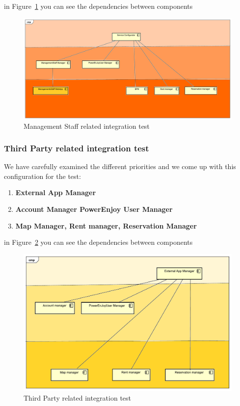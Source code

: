 \documentclass[english]{article}
\begin{document}
			in Figure~\ref{fig:managementstaff} you can see the dependencies between components  
			\begin{figure}[H]
				\centering
				\includegraphics[scale=0.3]{./testingOrganization/managementstaff.pdf}%
				\caption{Management Staff related integration test}
				\label{fig:managementstaff}
			\end{figure}
		
		\subsubsection{Third Party related integration test}
		       We have carefully examined the different priorities and we come up with this configuration for the test:
			\begin{enumerate}
				\item \textbf{External App Manager} 
				\item \textbf{Account Manager PowerEnjoy User Manager} 
				\item \textbf{Map Manager, Rent manager, Reservation Manager}
			\end{enumerate}
			
			in Figure~\ref{fig:externalappmanager} you can see the dependencies between components 
			\begin{figure}[H]
				\centering
				\includegraphics[scale=0.4]{./testingOrganization/externalappmanager.pdf}%
				\caption{Third Party related integration test}
				\label{fig:externalappmanager}
			\end{figure}
\end{document}
